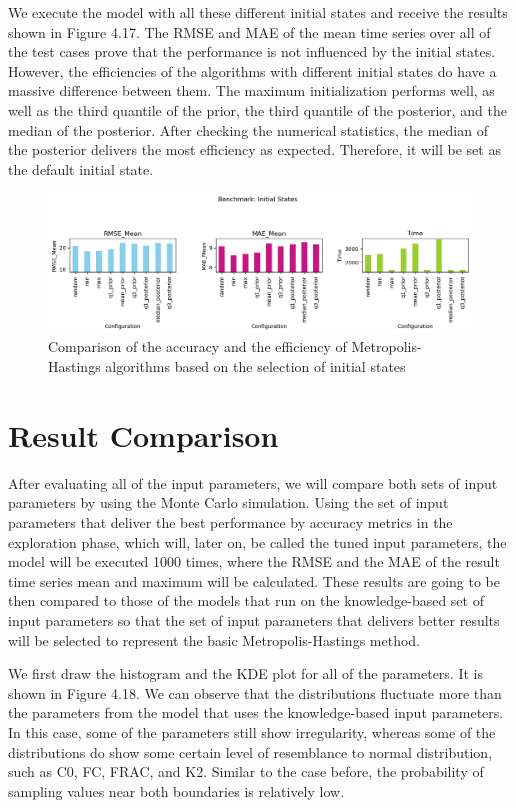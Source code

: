 We execute the model with all these different initial states and receive the results shown in Figure 4.17. The RMSE and MAE of the mean time series over all of the test cases prove that the performance is not influenced by the initial states. However, the efficiencies of the algorithms with different initial states do have a massive difference between them. The maximum initialization performs well, as well as the third quantile of the prior, the third quantile of the posterior, and the median of the posterior. After checking the numerical statistics, the median of the posterior delivers the most efficiency as expected. Therefore, it will be set as the default initial state.

\begin{figure}[H]
    \centering
    \includegraphics[width=1\textwidth]{figures/basic_mh/benchmark/init_method.png}
    \captionsetup{width=.8\textwidth}
    \caption{Comparison of the accuracy and the efficiency of Metropolis-Hastings algorithms based on the selection of initial states}
    \label{fig:enter-label}
\end{figure}


\section{Result Comparison}
After evaluating all of the input parameters, we will compare both sets of input parameters by using the Monte Carlo simulation. Using the set of input parameters that deliver the best performance by accuracy metrics in the exploration phase, which will, later on, be called the tuned input parameters, the model will be executed 1000 times, where the RMSE and the MAE of the result time series mean and maximum will be calculated. These results are going to be then compared to those of the models that run on the knowledge-based set of input parameters so that the set of input parameters that delivers better results will be selected to represent the basic Metropolis-Hastings method.

We first draw the histogram and the KDE plot for all of the parameters. It is shown in Figure 4.18. We can observe that the distributions fluctuate more than the parameters from the model that uses the knowledge-based input parameters. In this case, some of the parameters still show irregularity, whereas some of the distributions do show some certain level of resemblance to normal distribution, such as C0, FC, FRAC, and K2. Similar to the case before, the probability of sampling values near both boundaries is relatively low. 

